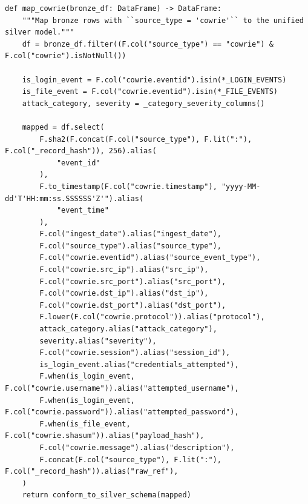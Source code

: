 \documentclass[11pt,a4paper]{report}
\begin{document}
\begin{lstlisting}[style=pystyle]
def map_cowrie(bronze_df: DataFrame) -> DataFrame:
    """Map bronze rows with ``source_type = 'cowrie'`` to the unified silver model."""
    df = bronze_df.filter((F.col("source_type") == "cowrie") & F.col("cowrie").isNotNull())

    is_login_event = F.col("cowrie.eventid").isin(*_LOGIN_EVENTS)
    is_file_event = F.col("cowrie.eventid").isin(*_FILE_EVENTS)
    attack_category, severity = _category_severity_columns()

    mapped = df.select(
        F.sha2(F.concat(F.col("source_type"), F.lit(":"), F.col("_record_hash")), 256).alias(
            "event_id"
        ),
        F.to_timestamp(F.col("cowrie.timestamp"), "yyyy-MM-dd'T'HH:mm:ss.SSSSSS'Z'").alias(
            "event_time"
        ),
        F.col("ingest_date").alias("ingest_date"),
        F.col("source_type").alias("source_type"),
        F.col("cowrie.eventid").alias("source_event_type"),
        F.col("cowrie.src_ip").alias("src_ip"),
        F.col("cowrie.src_port").alias("src_port"),
        F.col("cowrie.dst_ip").alias("dst_ip"),
        F.col("cowrie.dst_port").alias("dst_port"),
        F.lower(F.col("cowrie.protocol")).alias("protocol"),
        attack_category.alias("attack_category"),
        severity.alias("severity"),
        F.col("cowrie.session").alias("session_id"),
        is_login_event.alias("credentials_attempted"),
        F.when(is_login_event, F.col("cowrie.username")).alias("attempted_username"),
        F.when(is_login_event, F.col("cowrie.password")).alias("attempted_password"),
        F.when(is_file_event, F.col("cowrie.shasum")).alias("payload_hash"),
        F.col("cowrie.message").alias("description"),
        F.concat(F.col("source_type"), F.lit(":"), F.col("_record_hash")).alias("raw_ref"),
    )
    return conform_to_silver_schema(mapped)
\end{lstlisting}
\end{document}
